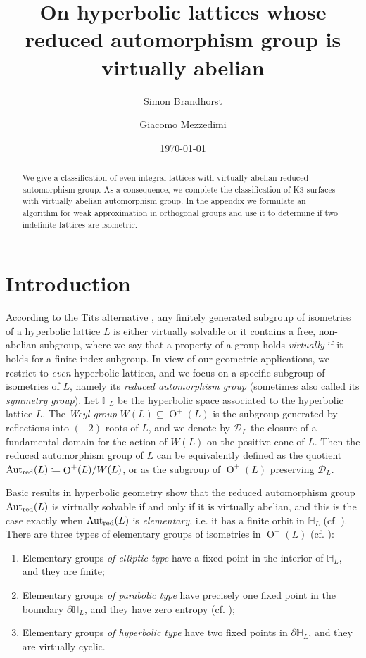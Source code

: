 \documentclass[11pt,letterpaper]{amsart}
\title{On hyperbolic lattices whose reduced automorphism group is virtually abelian}
\author{Simon Brandhorst}
\author{Giacomo Mezzedimi}
\date{\today}
\DeclareMathOperator{\Aut}{Aut}
\DeclareMathOperator{\Or}{O}
\newcommand{\HH}{\mathbb{H}}
\newcommand{\AutredL}{\Aut_{\rm red}(L)}
\theoremstyle{definition}
\theoremstyle{remark}
\begin{document}
\maketitle
\begin{abstract}
    We give a classification of even integral lattices with virtually abelian reduced automorphism group. As a consequence, we complete the classification of K3 surfaces with virtually abelian automorphism group.
    In the appendix we formulate an algorithm for weak approximation in orthogonal groups and use it to determine if two indefinite lattices are isometric. 
\end{abstract}


\section{Introduction}

According to the Tits alternative \cite{tits}, any finitely generated subgroup of isometries of a hyperbolic lattice $L$ is either virtually solvable or it contains a free, non-abelian subgroup, where we say that a property of a group holds \emph{virtually} if it holds for a finite-index subgroup. In view of our geometric applications, we restrict to \emph{even} hyperbolic lattices, and we focus on a specific subgroup of isometries of $L$, namely its \emph{reduced automorphism group} (sometimes also called its \emph{symmetry group}). Let $\HH_L$ be the hyperbolic space associated to the hyperbolic lattice $L$. The \emph{Weyl group} $W(L)\subseteq \Or^+(L)$ is the subgroup generated by reflections into $(-2)$-roots of $L$, and we denote by $\mathcal{D}_L$ the closure of a fundamental domain for the action of $W(L)$ on the positive cone of $L$. Then the reduced automorphism group of $L$ can be equivalently defined as the quotient $\AutredL \coloneqq \Or^+(L)/W(L)$, or as the subgroup of $\Or^+(L)$ preserving $\mathcal{D}_L$.

Basic results in hyperbolic geometry show that the reduced automorphism group $\AutredL$ is virtually solvable if and only if it is virtually abelian, and this is the case exactly when $\AutredL$ is \emph{elementary}, i.e. it has a finite orbit in $\HH_L$ (cf. \cite[Theorems~5.5.9~and~5.5.10]{ratcliffe}). There are three types of elementary groups of isometries in $\Or^+(L)$ (cf. \cite[§5.5]{ratcliffe}):
\begin{enumerate}
\item Elementary groups \emph{of elliptic type} have a fixed point in the interior of $\HH_L$, and they are finite;
\item Elementary groups \emph{of parabolic type} have precisely one fixed point in the boundary $\partial \HH_L$, and they have zero entropy (cf. \cite[Theorem~3.7]{brandhorst.mezzedimi});
\item Elementary groups \emph{of hyperbolic type} have two fixed points in $\partial \HH_L$, and they are virtually cyclic.
\end{enumerate}
\end{document}
